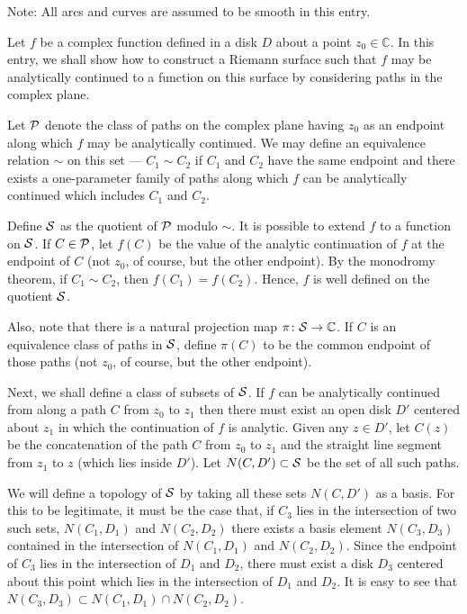 \documentclass[12pt]{article}
\begin{document}
Note: All arcs and curves are assumed to be smooth in this entry.

Let $f$ be a complex function defined in a disk $D$ about a point $z_0 \in \mathbb{C}$.  In this entry, we shall show how to construct a Riemann surface such that $f$ may be analytically continued to a function on this surface by considering paths in the complex plane.

Let ${\cal P}$ denote the class of paths on the complex plane having $z_0$ as an endpoint along which $f$ may be analytically continued.  We may define an equivalence relation $\sim$ on this set --- $C_1 \sim C_2$ if $C_1$ and $C_2$ have the same endpoint and there exists a one-parameter family of paths along which $f$ can be analytically continued which includes $C_1$ and $C_2$.

Define ${\cal S}$ as the quotient of ${\cal P}$ modulo $\sim$.  It is possible to extend $f$ to a function on ${\cal S}$.  If $C \in {\cal P}$, let $f(C)$ be the value of the analytic continuation of $f$ at the endpoint of $C$ (not $z_0$, of course, but the other endpoint).  By the monodromy theorem, if $C_1 \sim C_2$, then $f(C_1) = f(C_2)$.  Hence, $f$ is well defined on the quotient ${\cal S}$.

Also, note that there is a natural projection map $\pi \colon {\cal S} \to \mathbb{C}$.  If $C$ is an equivalence class of paths in ${\cal S}$, define $\pi (C)$ to be the common endpoint of those paths (not $z_0$, of course, but the other endpoint).

Next, we shall define a class of subsets of ${\cal S}$.  If $f$ can be analytically continued from along a path $C$ from $z_0$ to $z_1$ then there must exist an open disk $D'$ centered about $z_1$ in which the continuation of $f$ is analytic.  Given any $z \in D'$, let $C(z)$ be the concatenation of the path $C$ from $z_0$ to $z_1$ and the straight line segment from $z_1$ to $z$ (which lies inside $D'$).  Let $N(C, D') \subset {\cal S}$ be the set of all such paths.

We will define a topology of ${\cal S}$ by taking all these sets $N(C,D')$ as a basis.  For this to be legitimate, it must be the case that, if $C_3$ lies in the intersection of two such sets, $N(C_1,D_1)$ and $N(C_2,D_2)$ there exists a basis element $N(C_3,D_3)$ contained in the intersection of $N(C_1,D_1)$ and $N(C_2,D_2)$.  Since the endpoint of $C_3$ lies in the intersection of $D_1$ and $D_2$, there must exist a disk $D_3$ centered about this point which lies in the intersection of $D_1$ and $D_2$.  It is easy to see that $N(C_3,D_3) \subset N(C_1,D_1) \cap N(C_2,D_2)$.
\end{document}

